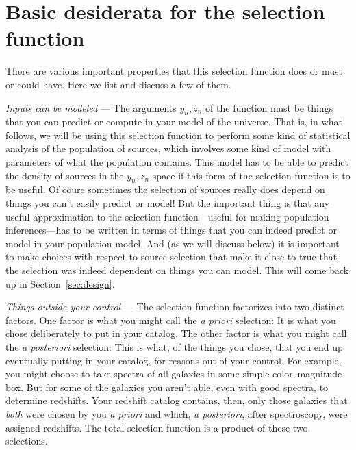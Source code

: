 \documentclass[modern]{aastex62}
\newcommand{\sectionname}{Section}
\newcommand{\foreign}[1]{\textsl{#1}}
\renewcommand{\paragraph}[1]{\medskip\noindent\textit{#1} ---}
\begin{document}
\section{Basic desiderata for the selection function}\label{sec:desiderata}

There are various important properties that this selection function
does or must or could have.
Here we list and discuss a few of them.

\paragraph{Inputs can be modeled}
The arguments $y_n, z_n$ of the function must be things
that you can predict or compute in your model of the universe.
That is, in what follows, we will be using this selection function to
perform some kind of statistical analysis of the population of
sources, which involves some kind of model with parameters of what the
population contains.
This model has to be able to predict the density of sources in the
$y_n, z_n$ space if this form of the selection function is to be
useful.
Of coure sometimes the selection of sources really does depend on
things you can't easily predict or model!
But the important thing is that any useful approximation to the
selection function---useful for making population inferences---has to
be written in terms of things that you can indeed predict or model in
your population model.
And (as we will discuss below) it is important to make choices with
respect to source selection that make it close to true that the
selection was indeed dependent on things you can model.
This will come back up in \sectionname~\ref{sec:design}.

\paragraph{Things outside your control}
The selection function factorizes into two distinct factors.
One factor is what you might call the \foreign{a priori} selection:
It is what you chose deliberately to put in your catalog.
The other factor is what you might call the \foreign{a posteriori}
selection:
This is what, of the things you chose, that you end up eventually
putting in your catalog, for reasons out of your control.
For example, you might choose to take spectra of all galaxies in some
simple color--magnitude box.
But for some of the galaxies you aren't able, even with good spectra,
to determine redshifts.
Your redshift catalog contains, then, only those galaxies that
\emph{both} were chosen by you \foreign{a priori} and which,
\foreign{a posteriori}, after spectroscopy, were assigned redshifts.
The total selection function is a product of these two selections.
\end{document}
